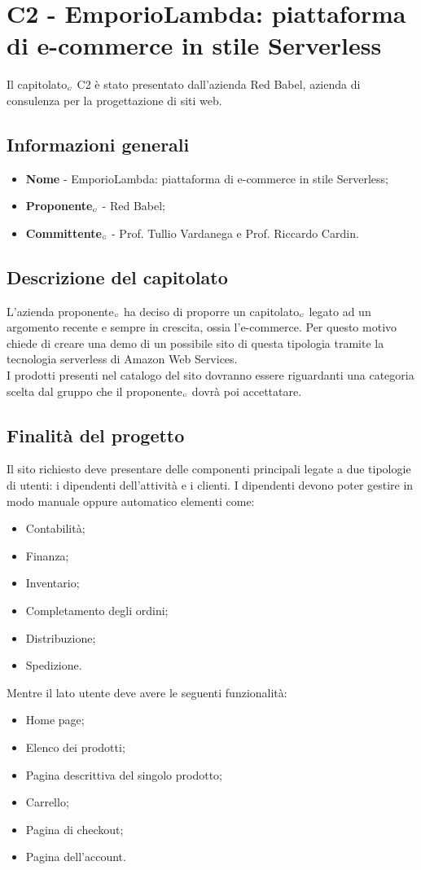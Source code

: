 \chapter{C2 - EmporioLambda: piattaforma di e-commerce in stile Serverless} \label{CapitolatoC2}
Il capitolato$_{\scaleto{G}{3pt}}$ C2 è stato presentato dall'azienda Red Babel, azienda di consulenza per la progettazione di siti web.
\section{Informazioni generali} \label{C2InformazioniGenerali}
\begin{itemize}
	\item \textbf{Nome} - EmporioLambda: piattaforma di e-commerce in stile Serverless;
	\item \textbf{Proponente}$_{\scaleto{G}{3pt}}$ - Red Babel;
	\item \textbf{Committente}$_{\scaleto{G}{3pt}}$ - Prof. Tullio Vardanega e Prof. Riccardo Cardin.
\end{itemize}
\section{Descrizione del capitolato} \label{C2DescrizioneDelCapitolato}
L'azienda proponente$_{\scaleto{G}{3pt}}$ ha deciso di proporre un capitolato$_{\scaleto{G}{3pt}}$ legato ad un argomento recente e sempre in crescita, ossia l'e-commerce. Per questo motivo chiede di creare una demo di un possibile sito di questa tipologia tramite la tecnologia serverless di Amazon Web Services. \\
I prodotti presenti nel catalogo del sito dovranno essere riguardanti una categoria scelta dal gruppo che il proponente$_{\scaleto{G}{3pt}}$ dovrà poi accettatare.
\section{Finalità del progetto} \label{C2FinalitàDelProgetto}
Il sito richiesto deve presentare delle componenti principali legate a due tipologie di utenti: i dipendenti dell'attività e i clienti. I dipendenti devono poter gestire in modo manuale oppure automatico elementi come:
\begin{itemize}
	\item Contabilità;
	\item Finanza;
	\item Inventario;
	\item Completamento degli ordini;
	\item Distribuzione;
	\item Spedizione.
\end{itemize}
Mentre il lato utente deve avere le seguenti funzionalità:
\begin{itemize}
	\item Home page;
	\item Elenco dei prodotti;
	\item Pagina descrittiva del singolo prodotto;
	\item Carrello;
	\item Pagina di checkout;
	\item Pagina dell'account.
\end{itemize}
